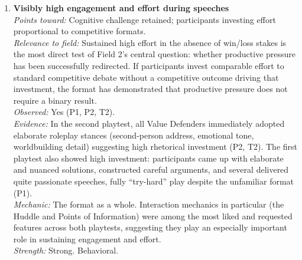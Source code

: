 \documentclass[12pt]{article}
\begin{document}
\begin{enumerate}

\item \textbf{Visibly high engagement and effort during speeches}\\
\textit{Points toward:} Cognitive challenge retained; participants investing effort proportional to competitive formats.\\
\textit{Relevance to field:} Sustained high effort in the absence of win/loss stakes is the most direct test of Field 2's central question: whether productive pressure has been successfully redirected. If participants invest comparable effort to standard competitive debate without a competitive outcome driving that investment, the format has demonstrated that productive pressure does not require a binary result.\\
\textit{Observed:} Yes (P1, P2, T2).\\
\textit{Evidence:} In the second playtest, all Value Defenders immediately adopted elaborate roleplay stances (second-person address, emotional tone, worldbuilding detail) suggesting high rhetorical investment (P2, T2). The first playtest also showed high investment: participants came up with elaborate and nuanced solutions, constructed careful arguments, and several delivered quite passionate speeches, fully ``try-hard'' play despite the unfamiliar format (P1).\\
\textit{Mechanic:} The format as a whole. Interaction mechanics in particular (the Huddle and Points of Information) were among the most liked and requested features across both playtests, suggesting they play an especially important role in sustaining engagement and effort.\\
\textit{Strength:} Strong. Behavioral.


\end{enumerate}
\end{document}
